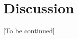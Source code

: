\documentclass[12pt]{article}
\begin{document}
\section*{Discussion}

[To be continued]








\clearpage

\end{document}
